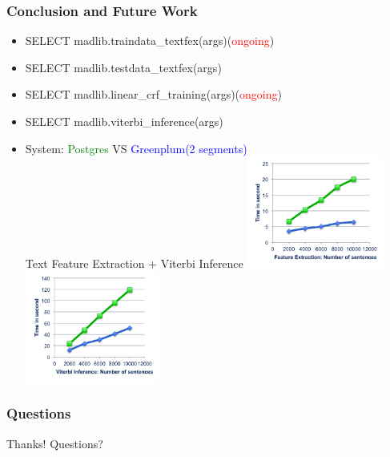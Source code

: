 \documentclass{beamer}
\begin{document}
\begin{frame}
  \frametitle{Conclusion and Future Work}

  \begin{itemize}
    \item SELECT madlib.traindata\_textfex(args)(\textcolor{red}{ongoing})
    \item SELECT madlib.testdata\_textfex(args)
    \item SELECT madlib.linear\_crf\_training(args)(\textcolor{red}{ongoing})
    \item SELECT madlib.viterbi\_inference(args)
  \item System: \textcolor{green}{Postgres} VS \textcolor{blue}{Greenplum(2 segments)}\\
	  Text Feature Extraction + Viterbi Inference
	  \includegraphics[height=9.9em]{extraction.png}
	  \includegraphics[height=9.9em]{viterbi.png}
  \end{itemize}
\end{frame}

\begin{frame}
  \frametitle{Questions}
  \begin{center}
   Thanks! Questions?
  \end{center}
\end{frame}
\end{document}
